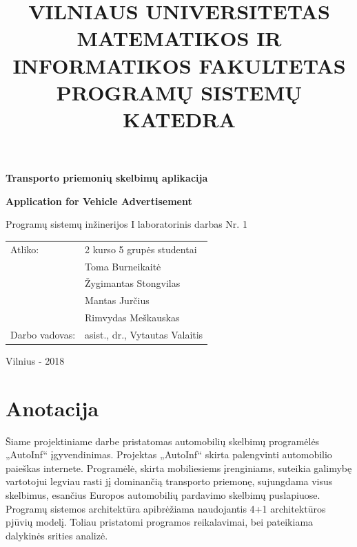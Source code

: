 \documentclass[12pt]{article}
\title{VILNIAUS UNIVERSITETAS \bigbreak \bigbreak 
MATEMATIKOS IR INFORMATIKOS FAKULTETAS \bigbreak \bigbreak 
PROGRAMŲ SISTEMŲ KATEDRA}
\author{}
\date{}
\begin{document}
	\clearpage
	\maketitle
	\thispagestyle{empty}

	\begin{center}
		\begin{Large}
			\textbf{Transporto priemonių skelbimų aplikacija} \bigbreak
		\end{Large}
		\begin{large}
			\textbf{Application for Vehicle Advertisement} \bigbreak
		\end{large}
		Programų sistemų inžinerijos I laboratorinis darbas Nr. 1 \bigbreak

		\bigbreak
		\bigbreak
		\bigbreak
		\bigbreak
		\bigbreak
		\bigbreak
		\bigbreak

		\begin{tabular}{ll}
			Atliko:        & 2 kurso 5 grupės studentai \\
		               	   & Toma Burneikaitė \\
		               	   & Žygimantas Stongvilas \\
		                   & Mantas Jurčius \\
		                   & Rimvydas Meškauskas \\
			Darbo vadovas: & asist., dr., Vytautas Valaitis
		\end{tabular}

		\bigbreak
		\bigbreak
		\bigbreak
		\bigbreak
		\bigbreak
		\bigbreak
		\bigbreak
		\bigbreak
		\bigbreak
		\bigbreak
		\bigbreak
		\bigbreak
		\bigbreak
		\bigbreak
		\bigbreak

		Vilnius - 2018
	\end{center}
	\pagebreak
	
	\section*{Anotacija}
	\begin{indent}
	Šiame projektiniame darbe pristatomas automobilių skelbimų programėlės „AutoInf“ įgyvendinimas. Projektas „AutoInf“ skirta  palengvinti automobilio paieškas internete. Programėlė, skirta mobiliesiems įrenginiams, suteikia galimybę vartotojui legviau rasti jį dominančią transporto priemonę, sujungdama visus skelbimus, esančius Europos automobilių pardavimo skelbimų puslapiuose. Programų sistemos architektūra apibrėžiama naudojantis 4+1 architektūros pjūvių modelį. Toliau pristatomi programos reikalavimai, bei pateikiama dalykinės srities analizė.
	\end{indent}
	\pagebreak
\end{document}
